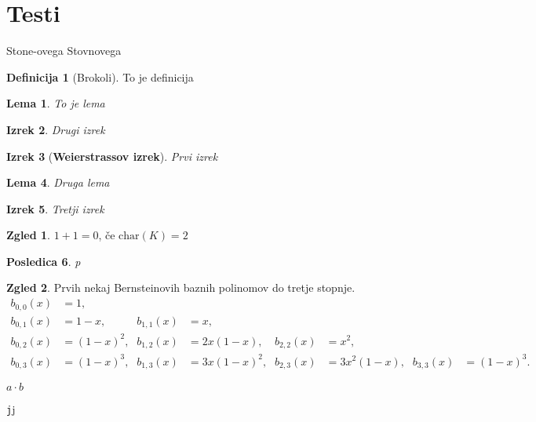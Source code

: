 \documentclass[a4paper, reqno]{amsart}
\theoremstyle{theorem}
\newtheorem{izrek}{Izrek}[section]
\newtheorem{lema}[izrek]{Lema}
\newtheorem{posledica}[izrek]{Posledica}
\theoremstyle{definition}
\newtheorem{definicija}{Definicija}[section]
\newtheorem*{zgled*}{Zgled}
\begin{document}
\section{Testi}

Stone-ovega
Stovnovega

\begin{definicija}[Brokoli]
	To je definicija
\end{definicija}

\begin{lema}
	To je lema
\end{lema}

\begin{izrek}
	Drugi izrek
\end{izrek}

\begin{izrek}[\textbf{Weierstrassov izrek}]
	Prvi izrek
\end{izrek}

\begin{lema}
	Druga lema
\end{lema}

\begin{izrek}
	Tretji izrek
\end{izrek}

\begin{zgled*}
	$1 + 1 = 0$, če $\text{char}(K) = 2$
\end{zgled*}

\begin{posledica}
	p
\end{posledica}

\begin{zgled*}
	Prvih nekaj Bernsteinovih baznih polinomov do tretje stopnje.
		\begin{align*}
			b_{0,0}(x) &= 1\text{,}          &             &               
			&             &               &             &  \\
			b_{0,1}(x) &= 1 - x\text{,}      &  b_{1,1}(x) &= x\text{,}            
			&             &               &             &  \\
			b_{0,2}(x) &= (1 - x)^2\text{,}  &  b_{1,2}(x) &= 2x(1 - x)\text{,}    
			&  b_{2,2}(x) &= x^2\text{,}          &             &  \\ 
			b_{0,3}(x) &= (1 - x)^3\text{,}  &  b_{1,3}(x) &= 3x(1 - x)^2\text{,}  
			&  b_{2,3}(x) &= 3x^2(1 - x)\text{,}  &  b_{3,3}(x) &= (1 - x)^3\text{.}
		\end{align*}
	\end{zgled*}

$ a \cdot b$

\texttt{j}j
\end{document}
